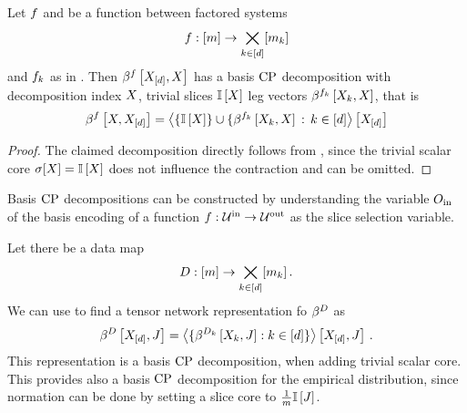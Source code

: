\begin{theorem}
    \label{the:functionDecompositionBasisCP}
    Let $f$ and be a function between factored systems
    \begin{align*}
        f : [m] \rightarrow  \bigtimes_{k\in[d]}[m_{k}]
    \end{align*}
    and $f_{k}$ as in .
    Then $\beta^{f}\left[X_{[d]},X\right]$ has a basis $\mathrm{CP}$ decomposition with decomposition index $X$, trivial slices $\mathbb{I}\left[X\right]$ leg vectors $\beta^{f_{k}}\left[X_{k},X\right]$, that is
    \begin{align*}
        \beta^{f}\left[X,X_{[d]}\right]
        = \left\langle \{\mathbb{I}\left[X\right]\} \cup \{\beta^{f_{k}}\left[X_{k},X\right]\,:\,k\in[d]\right\rangle \left[ X_{[d]} \right]
    \end{align*}
\end{theorem}
\begin{proof}
    The claimed decomposition directly follows from , since the trivial scalar core $\sigma[X]=\mathbb{I}\left[X\right]$ does not influence the contraction and can be omitted.
\end{proof}

Basis $\mathrm{CP}$ decompositions can be constructed by understanding the variable $O_{\mathrm{in}}$ of the basis encoding of a function $f:\mathcal{U}^{\mathrm{in}} \rightarrow \mathcal{U}^{\mathrm{out}}$ as the slice selection variable.

\begin{example}
    \label{exa:empDistCP}
    Let there be a data map
    \begin{align*}
        D : [m] \rightarrow \bigtimes_{k\in[d]}[m_{k}] \, .
    \end{align*}
    We can use  to find a tensor network representation fo $\beta^{D}$ as
    \begin{align*}
        \beta^{D}\left[X_{[d]},J\right]
        = \left\langle 
            \{\beta^{D_{k}}\left[X_{k},J\right] : k\in[d] \}
        \right\rangle \left[ X_{[d]},J \right] \, .
    \end{align*}
    This representation is a basis $\mathrm{CP}$ decomposition, when adding trivial scalar core.
    This provides also a basis $\mathrm{CP}$ decomposition for the empirical distribution, since normation can be done by setting a slice core to $\frac{1}{m}\mathbb{I}\left[J\right]$.
\end{example}

